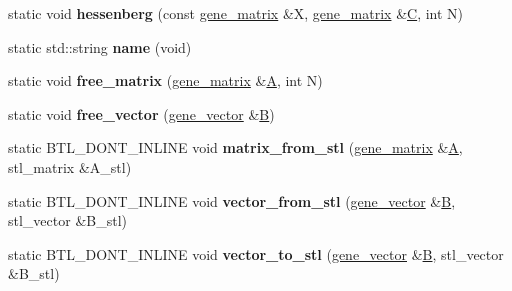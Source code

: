 \begin{DoxyCompactItemize}
\item 
\mbox{\label{classeigen2__interface_aae6c5d86033789d3e3ba357d16c7bf26}} 
static void {\bfseries hessenberg} (const \hyperlink{group___core___module_class_eigen_1_1_matrix}{gene\+\_\+matrix} \&X, \hyperlink{group___core___module_class_eigen_1_1_matrix}{gene\+\_\+matrix} \&\hyperlink{group___core___module}{C}, int N)
\item 
\mbox{\label{classeigen2__interface_af5bff3d00a1514dd3fb3ed7b2c6874ba}} 
static std\+::string {\bfseries name} (void)
\item 
\mbox{\label{classeigen2__interface_a04b177fda6aeb04e0df22fe3254ebdbb}} 
static void {\bfseries free\+\_\+matrix} (\hyperlink{group___core___module_class_eigen_1_1_matrix}{gene\+\_\+matrix} \&\hyperlink{group___core___module_class_eigen_1_1_matrix}{A}, int N)
\item 
\mbox{\label{classeigen2__interface_a44270250d08a203ebb5cc443d01b8688}} 
static void {\bfseries free\+\_\+vector} (\hyperlink{group___core___module_class_eigen_1_1_matrix}{gene\+\_\+vector} \&\hyperlink{group___core___module_class_eigen_1_1_matrix}{B})
\item 
\mbox{\label{classeigen2__interface_ac6931cdd07d2445ea68d6ebb375006e6}} 
static B\+T\+L\+\_\+\+D\+O\+N\+T\+\_\+\+I\+N\+L\+I\+NE void {\bfseries matrix\+\_\+from\+\_\+stl} (\hyperlink{group___core___module_class_eigen_1_1_matrix}{gene\+\_\+matrix} \&\hyperlink{group___core___module_class_eigen_1_1_matrix}{A}, stl\+\_\+matrix \&A\+\_\+stl)
\item 
\mbox{\label{classeigen2__interface_aad66484e671420e47aa156f518151ef2}} 
static B\+T\+L\+\_\+\+D\+O\+N\+T\+\_\+\+I\+N\+L\+I\+NE void {\bfseries vector\+\_\+from\+\_\+stl} (\hyperlink{group___core___module_class_eigen_1_1_matrix}{gene\+\_\+vector} \&\hyperlink{group___core___module_class_eigen_1_1_matrix}{B}, stl\+\_\+vector \&B\+\_\+stl)
\item 
\mbox{\label{classeigen2__interface_a0cbdf9e3aa99a6aa0aff8e16dac65521}} 
static B\+T\+L\+\_\+\+D\+O\+N\+T\+\_\+\+I\+N\+L\+I\+NE void {\bfseries vector\+\_\+to\+\_\+stl} (\hyperlink{group___core___module_class_eigen_1_1_matrix}{gene\+\_\+vector} \&\hyperlink{group___core___module_class_eigen_1_1_matrix}{B}, stl\+\_\+vector \&B\+\_\+stl)

\end{DoxyCompactItemize}
